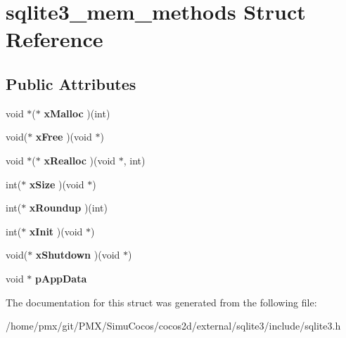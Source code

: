 \hypertarget{structsqlite3__mem__methods}{}\section{sqlite3\+\_\+mem\+\_\+methods Struct Reference}
\label{structsqlite3__mem__methods}
\subsection*{Public Attributes}
\begin{DoxyCompactItemize}
\item 
\mbox{\label{structsqlite3__mem__methods_acb9151cf501c851b61ab6b378832b159}} 
void $\ast$($\ast$ {\bfseries x\+Malloc} )(int)
\item 
\mbox{\label{structsqlite3__mem__methods_aa2e7fe8d030adaa17fd23a44fec1eca1}} 
void($\ast$ {\bfseries x\+Free} )(void $\ast$)
\item 
\mbox{\label{structsqlite3__mem__methods_a5bb7e62164d0934888473c618c61dc77}} 
void $\ast$($\ast$ {\bfseries x\+Realloc} )(void $\ast$, int)
\item 
\mbox{\label{structsqlite3__mem__methods_a6c68275b577d66ae659ef30344c8f86c}} 
int($\ast$ {\bfseries x\+Size} )(void $\ast$)
\item 
\mbox{\label{structsqlite3__mem__methods_a8b3f0d1ddeb498c4aaf9bbce5b92a268}} 
int($\ast$ {\bfseries x\+Roundup} )(int)
\item 
\mbox{\label{structsqlite3__mem__methods_ad0997b548928358d655000b6ac825cf4}} 
int($\ast$ {\bfseries x\+Init} )(void $\ast$)
\item 
\mbox{\label{structsqlite3__mem__methods_a6f48100692bd935d7f3dbb8c701ab6ca}} 
void($\ast$ {\bfseries x\+Shutdown} )(void $\ast$)
\item 
\mbox{\label{structsqlite3__mem__methods_af91b7adfa1f6aace0b129bac800bd444}} 
void $\ast$ {\bfseries p\+App\+Data}
\end{DoxyCompactItemize}


The documentation for this struct was generated from the following file\+:\begin{DoxyCompactItemize}
\item 
/home/pmx/git/\+P\+M\+X/\+Simu\+Cocos/cocos2d/external/sqlite3/include/sqlite3.\+h\end{DoxyCompactItemize}
